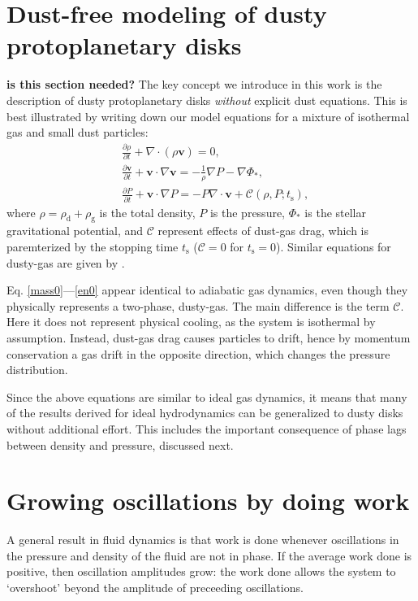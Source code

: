 \documentclass[iop, numberedappendix]{emulateapj}
\newcommand{\p}{\partial}
\newcommand{\rhod}{\rho_\mathrm{d}}
\newcommand{\rhog}{\rho_\mathrm{g}}
\newcommand{\tstop}{t_\mathrm{s}}
\begin{document}
\section{Dust-free modeling of dusty protoplanetary disks}\label{key_idea}
{\bf is this section needed?} 
The key concept we introduce in this work is the description
of dusty protoplanetary disks \emph{without} explicit dust
equations. This is best illustrated by writing down our model   
equations for a mixture of isothermal gas and small
dust particles: 
\begin{align}  
  &\frac{\p \rho}{\p t} + \nabla\cdot\left(\rho\bm{v}\right)= 0, \label{mass0}\\ 
  &\frac{\p\bm{v}}{\p t} + \bm{v}\cdot\nabla\bm{v} = -
  \frac{1}{\rho}\nabla  P - \nabla \Phi_*,\label{mom0}\\ 
 & \frac{\p P}{\p t} + \bm{v}\cdot\nabla P 
  = - P \nabla\cdot\bm{v}
                + \mathcal{C}(\rho, P; \tstop)\label{en0}, 
\end{align}
where $\rho=\rhod + \rhog$ is the total density, $P$ is the pressure,
$\Phi_*$ is the stellar gravitational potential,   
and $\mathcal{C}$ represent effects of dust-gas drag, which
is paremterized by the stopping time $\tstop$ ($\mathcal{C}=0$ for
$\tstop=0$). Similar equations for dusty-gas are given by
\cite{price15}. 

Eq. \ref{mass0}---\ref{en0} appear identical to adiabatic gas
dynamics, even though they physically represents a two-phase,
dusty-gas. The main difference is the term $\mathcal{C}$. Here it does
not represent physical cooling, as the system is isothermal by
assumption. Instead, dust-gas drag causes particles to drift, hence by
momentum conservation a gas drift in the opposite direction, which
changes the pressure distribution.    

Since the above equations are similar to ideal gas dynamics, it 
means that many of the results derived for ideal hydrodynamics can be  
generalized to dusty disks without additional effort. This includes 
the important consequence of phase lags between density and pressure,
discussed next.  




\section{Growing oscillations by doing work}\label{grow_osc}
A general result in fluid dynamics is that work is done whenever
oscillations in the pressure and density of the fluid are not in
phase. If  the average work done is positive, then oscillation
amplitudes grow: the work done allows the system to `overshoot' beyond 
the amplitude of preceeding oscillations.   
\end{document}
